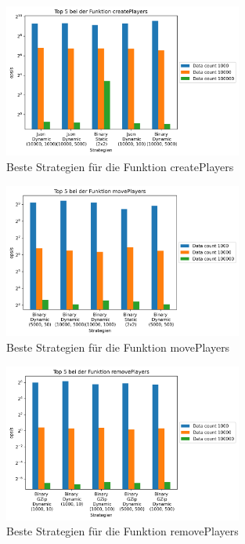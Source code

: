 \begin{figure}[htp]
    \centering
    \includegraphics[width=0.7\textwidth]{images/plots/createPlayers.png}
    \caption{Beste Strategien für die Funktion createPlayers}
    \label{fig:createPlayers}
\end{figure}

\begin{figure}[htp]
    \centering
    \includegraphics[width=0.7\textwidth]{images/plots/movePlayers.png}
    \caption{Beste Strategien für die Funktion movePlayers}
    \label{fig:movePlayers}
\end{figure}

\begin{figure}[htp]
    \centering
    \includegraphics[width=0.7\textwidth]{images/plots/removePlayers.png}
    \caption{Beste Strategien für die Funktion removePlayers}
    \label{fig:removePlayers}
\end{figure}

